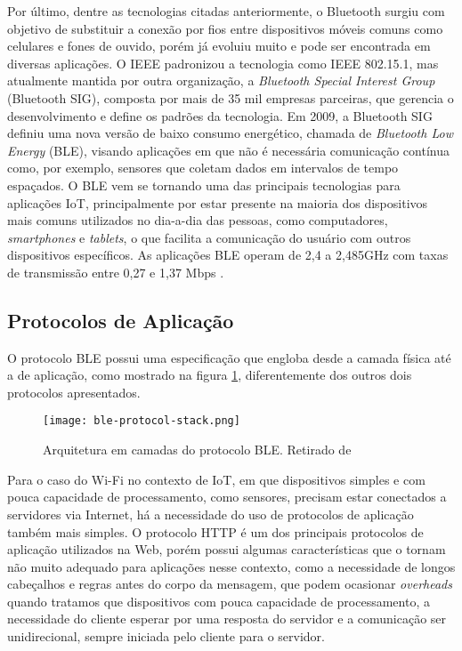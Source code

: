 \documentclass[../monografia.tex]{subfiles}
\begin{document}
Por último, dentre as tecnologias citadas anteriormente, o Bluetooth surgiu com objetivo de substituir a conexão por fios entre dispositivos móveis comuns como celulares e fones de ouvido, porém já evoluiu muito e pode ser encontrada em diversas aplicações. O IEEE padronizou a tecnologia como IEEE 802.15.1, mas atualmente mantida por outra organização, a \textit{Bluetooth Special Interest Group} (Bluetooth SIG), composta por mais de 35 mil empresas parceiras, que gerencia o desenvolvimento e define os padrões da tecnologia. Em 2009, a Bluetooth SIG definiu uma nova versão de baixo consumo energético, chamada de \textit{Bluetooth Low Energy} (BLE), visando aplicações em que não é necessária comunicação contínua como, por exemplo, sensores que coletam dados em intervalos de tempo espaçados. O BLE vem se tornando uma das principais tecnologias para aplicações IoT, principalmente por estar presente na maioria dos dispositivos mais comuns utilizados no dia-a-dia das pessoas, como computadores, \textit{smartphones} e \textit{tablets}, o que facilita a comunicação do usuário com outros dispositivos específicos. As aplicações BLE operam de 2,4 a 2,485GHz com taxas de transmissão entre 0,27 e 1,37 Mbps \cite{ble-datarate}. 

\subsection{Protocolos de Aplicação} \label{protocolos-aplicacao}

O protocolo BLE possui uma especificação que engloba desde a camada física até a de aplicação, como mostrado na figura \ref{fig:ble-stack}, diferentemente dos outros dois protocolos apresentados. 

\begin{figure}[h]
\centering
\texttt{[image: ble-protocol-stack.png]}
\caption{Arquitetura em camadas do protocolo BLE. Retirado de \cite{ble-protocol-stack}}
\label{fig:ble-stack}
\end{figure}

Para o caso do Wi-Fi no contexto de IoT, em que dispositivos simples e com pouca capacidade de processamento, como sensores, precisam estar conectados a servidores via Internet, há a necessidade do uso  de protocolos de aplicação também mais simples. O protocolo HTTP é um dos principais protocolos de aplicação utilizados na Web, porém possui algumas características que o tornam não muito adequado para aplicações nesse contexto, como a necessidade de longos cabeçalhos e regras antes do corpo da mensagem, que podem ocasionar \textit{overheads} quando tratamos que dispositivos com pouca capacidade de processamento, a necessidade do cliente esperar por uma resposta do servidor e a comunicação ser unidirecional, sempre iniciada pelo cliente para o servidor.
\end{document}
